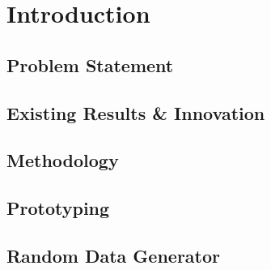 \chapter{Introduction}\label{ch:introduction}

\section{Problem Statement}


\section {Existing Results \& Innovation}\label{sec:existing_results_innovation}


\section{Methodology}\label{sec:methodology}

\section{Prototyping}\label{sec:prototyping}

\section{Random Data Generator}\label{sec:random_data_generator}
